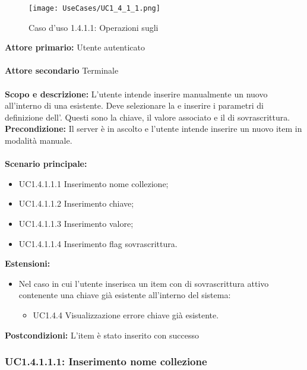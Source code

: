 \documentclass{scalatekids-article}
\begin{document}
\begin{figure}[H]
  \begin{center}
    \texttt{[image: UseCases/UC1\_4\_1\_1.png]}
    \caption*{Caso d'uso 1.4.1.1: Operazioni sugli }
  \end{center}
\end{figure}
\textbf{Attore primario:} Utente autenticato\\ \\
\textbf{Attore secondario} Terminale\\ \\
\textbf{Scopo e descrizione:} L'utente intende inserire manualmente un nuovo  all'interno di una  esistente. Deve selezionare la  e inserire i parametri di definizione dell'. Questi sono la chiave, il valore associato e il  di sovrascrittura.
\textbf{Precondizione:} Il server è in ascolto e l'utente intende inserire un nuovo item in modalità manuale.\\ \\
\textbf{Scenario principale:}
\begin{itemize}
\item UC1.4.1.1.1 Inserimento nome collezione;
\item UC1.4.1.1.2 Inserimento chiave;
\item UC1.4.1.1.3 Inserimento valore;
\item UC1.4.1.1.4 Inserimento flag sovrascrittura.
\end{itemize}
\textbf{Estensioni:}
\begin{itemize}
\item Nel caso in cui l'utente inserisca un item con  di sovrascrittura attivo contenente una chiave già esistente all'interno del sistema:
  \begin{itemize}
  \item UC1.4.4 Visualizzazione errore chiave già esistente.
  \end{itemize}
\end{itemize}
\textbf{Postcondizioni:} L'item è stato inserito con successo

\subsubsection{UC1.4.1.1.1: Inserimento nome collezione}
\end{document}
